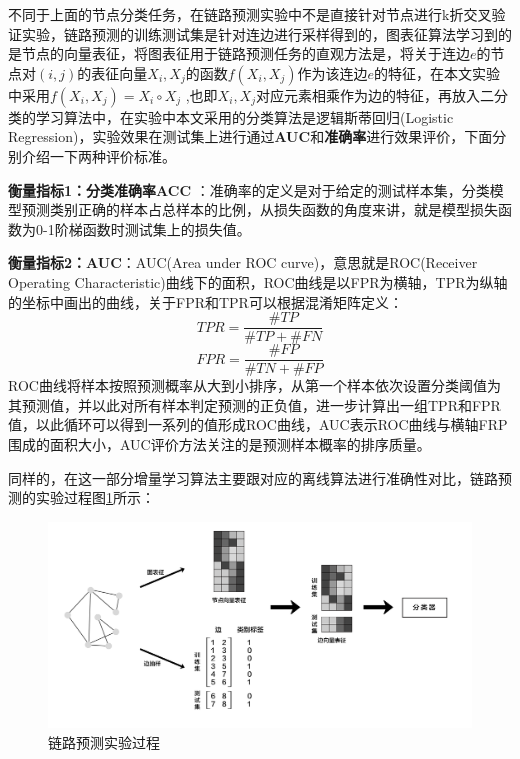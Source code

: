 不同于上面的节点分类任务，在链路预测实验中不是直接针对节点进行k折交叉验证实验，链路预测的训练测试集是针对连边进行采样得到的，图表征算法学习到的是节点的向量表征，将图表征用于链路预测任务的直观方法是，将关于连边$e$的节点对$(i,j)$的表征向量$X_i,X_j$的函数$f(X_i, X_j)$作为该连边$e$的特征，在本文实验中采用$f(X_i, X_j) = X_i\circ X_j$ ,也即$X_i, X_j$对应元素相乘作为边的特征，再放入二分类的学习算法中，在实验中本文采用的分类算法是逻辑斯蒂回归(Logistic Regression)，实验效果在测试集上进行通过\textbf{AUC}和\textbf{准确率}进行效果评价，下面分别介绍一下两种评价标准。

{\textbf{衡量指标1：分类准确率ACC}} ：准确率的定义是对于给定的测试样本集，分类模型预测类别正确的样本占总样本的比例，从损失函数的角度来讲，就是模型损失函数为0-1阶梯函数时测试集上的损失值。

\textbf{衡量指标2：AUC}：AUC(Area under ROC curve)，意思就是ROC(Receiver Operating Characteristic)曲线下的面积，ROC曲线是以FPR为横轴，TPR为纵轴的坐标中画出的曲线，关于FPR和TPR可以根据混淆矩阵定义：
\begin{equation}
	TPR = \frac{\#TP}{\#TP+\#FN}
\end{equation}
\begin{equation}
FPR = \frac{\#FP}{\#TN+\#FP}
\end{equation}
ROC曲线将样本按照预测概率从大到小排序，从第一个样本依次设置分类阈值为其预测值，并以此对所有样本判定预测的正负值，进一步计算出一组TPR和FPR值，以此循环可以得到一系列的值形成ROC曲线，AUC表示ROC曲线与横轴FRP围成的面积大小，AUC评价方法关注的是预测样本概率的排序质量。

 同样的，在这一部分增量学习算法主要跟对应的离线算法进行准确性对比，链路预测的实验过程图\ref{fig:link_prediction_process}所示：
\begin{figure}
	\centering
	\includegraphics[width=6in]{figures/link_predict_frame}
	\caption{链路预测实验过程}
	\label{fig:link_prediction_process}
\end{figure}

